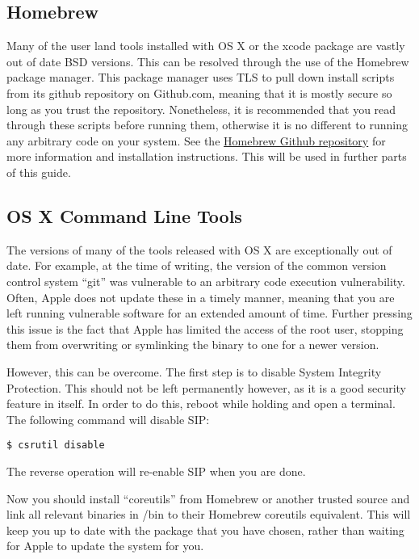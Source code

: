 			\subsection{Homebrew}
				Many of the user land tools installed with OS X or the xcode package are vastly out of date BSD versions.
				This can be resolved through the use of the Homebrew package manager.
				This package manager uses TLS to pull down install scripts from its github repository on Github.com, meaning that it is mostly secure so long as you trust the repository.
				Nonetheless, it is recommended that you read through these scripts before running them, otherwise it is no different to running any arbitrary code on your system.
				See the \href{https://github.com/Homebrew/homebrew}{Homebrew Github repository} for more information and installation instructions.
				This will be used in further parts of this guide.
			\subsection{OS X Command Line Tools}
				The versions of many of the tools released with OS X are exceptionally out of date.
				For example, at the time of writing, the version of the common version control system ``git'' was vulnerable to an arbitrary code execution vulnerability.
				Often, Apple does not update these in a timely manner, meaning that you are left running vulnerable software for an extended amount of time.
				Further pressing this issue is the fact that Apple has limited the access of the root user, stopping them from overwriting or symlinking the binary to one for a newer version.

				However, this can be overcome.
				The first step is to disable System Integrity Protection. This should not be left permanently however, as it is a good security feature in itself.
				In order to do this, reboot while holding  and open a terminal. The following command will disable SIP:
				\begin{lstlisting}[style=CLI]
					$ csrutil disable
				\end{lstlisting}
				The reverse operation will re-enable SIP when you are done.

				Now you should install ``coreutils'' from Homebrew or another trusted source and link all relevant binaries in /bin to their Homebrew coreutils equivalent.
				This will keep you up to date with the package that you have chosen, rather than waiting for Apple to update the system for you.
